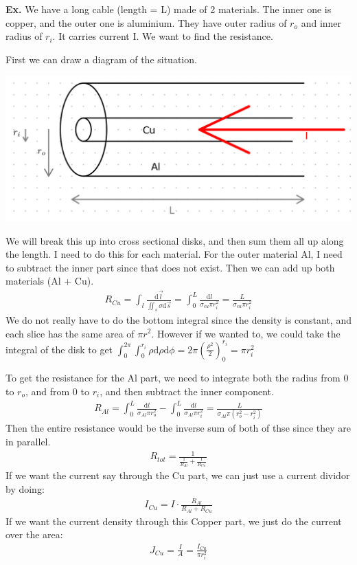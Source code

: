 \documentclass[12pt,letterpaper]{article} \usepackage{amsmath} \usepackage{graphicx} \usepackage[margin=1in]{geometry} \usepackage{longtable}  \usepackage{amssymb}
\begin{document}
	\begin{mdframed}
		\textbf{Ex. } We have a long cable (length = L) made of 2 materials. The inner one is copper, and the outer one is aluminium. They have outer radius of $r_o$ and inner radius of $r_i$. It carries current I. We want to find the resistance. 
		
		First we can draw a diagram of the situation. 
		\begin{center}
			\includegraphics[width=0.6\linewidth]{ex}
		\end{center}
		We will break this up into cross sectional disks, and then sum them all up along the length. I need to do this for each material. For the outer material Al, I need to subtract the inner part since that does not exist. Then we can add up both materials (Al + Cu).
		\begin{align*}
			R_{Cu} = \int_l \frac{\mathrm d \vec l}{\iint_s \sigma \mathrm d \vec s} = \int_0^L \frac{\mathrm d l}{\sigma_{cu}\pi r_i^2} = \frac{L}{\sigma_{cu}\pi r_i^2}
		\end{align*}
		We do not really have to do the bottom integral since the density is constant, and each slice has the same area of $\pi r^2$. However if we wanted to, we could take the integral of the disk to get $\int_0^{2\pi}\int_0^{r_i} \rho \mathrm d \rho \mathrm d \phi = 2\pi \left(\frac{\rho^2}{2}\right)^{r_i}_0=\pi r_i^2$
		
		To get the resistance for the Al part, we need to integrate both the radius from 0 to $r_o$, and from 0 to $r_i$, and then subtract the inner component. 
		\begin{align*}
			R_{Al} = \int_0^L \frac{\mathrm d l}{\sigma_{Al}\pi r_o^2} - \int_0^L \frac{\mathrm d l}{\sigma_{Al}\pi r_i^2} = \frac{L}{\sigma_{Al}\pi (r_o^2-r_i^2)}
		\end{align*}
		Then the entire resistance would be the inverse sum of both of thse since they are in parallel. 
		\begin{align*}
			R_{tot} = \frac{1}{\frac{1}{R_{Al}}+\frac{1}{R_{Cu}}}
		\end{align*}
		If we want the current say through the Cu part, we can just use a current dividor by doing:
		\begin{align*}
			I_{Cu} = I\cdot \frac{R_{Al}}{R_{Al}+R_{Cu}}
		\end{align*}
		If we want the current density through this Copper part, we just do the current over the area:
		\begin{align*}
			J_{Cu} = \frac{I}{A} = \frac{I_{Cu}}{\pi r_i^2}
		\end{align*}
		
		
	\end{mdframed}
	
\end{document}
